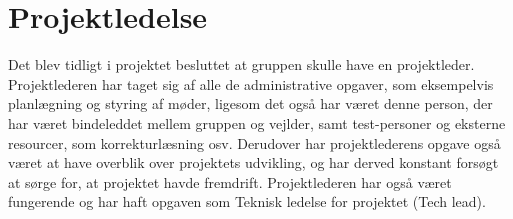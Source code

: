\chapter{Projektledelse}

Det blev tidligt i projektet besluttet at gruppen skulle have en projektleder. Projektlederen har taget sig af alle de administrative opgaver, som eksempelvis planlægning og styring af møder, ligesom det også har været denne person, der har været bindeleddet mellem gruppen og vejlder, samt test-personer og eksterne resourcer, som korrekturlæsning osv. Derudover har projektlederens opgave også været at have overblik over projektets udvikling, og har derved konstant forsøgt at sørge for, at projektet havde fremdrift. Projektlederen har også været fungerende og har haft opgaven som Teknisk ledelse for projektet (Tech lead).